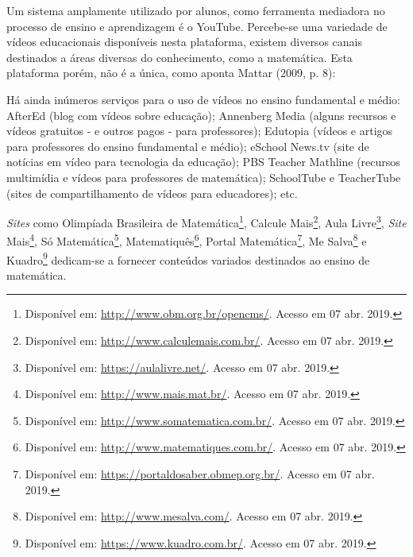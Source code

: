 \documentclass{IFNMG}
\begin{document}
Um sistema amplamente utilizado por alunos, como ferramenta mediadora no processo de ensino e aprendizagem é o YouTube. Percebe-se uma variedade de vídeos educacionais disponíveis nesta plataforma, existem diversos canais destinados a áreas diversas do conhecimento, como a matemática. Esta plataforma porém, não é a única, como aponta Mattar (2009, p. 8):
\begin{CitacaoLonga} 
Há ainda inúmeros serviços para o uso de vídeos no ensino fundamental e médio: AfterEd (blog com vídeos sobre educação); Annenberg Media (alguns recursos e vídeos gratuitos - e outros pagos - para professores); Edutopia (vídeos e artigos para professores do ensino fundamental e médio); eSchool News.tv (site de notícias em vídeo para tecnologia da educação); PBS Teacher Mathline (recursos multimídia e vídeos para professores de matemática); SchoolTube e TeacherTube (sites de compartilhamento de vídeos para educadores); etc. 
\end{CitacaoLonga} 

\textit{Sites} como Olimpíada Brasileira de Matemática\footnote[1]{Disponível em: \url{http://www.obm.org.br/opencms/}. Acesso em 07 abr. 2019.}, Calcule Mais\footnote[2]{Disponível em: \url{http://www.calculemais.com.br/}. Acesso em 07 abr. 2019.},  Aula Livre\footnote[3]{Disponível em: \url{https://aulalivre.net/}. Acesso em 07 abr. 2019.},  \textit{Site} Mais\footnote[4]{Disponível em: \url{http://www.mais.mat.br/}. Acesso em 07 abr. 2019.}, Só Matemática\footnote[5]{Disponível em: \url{http://www.somatematica.com.br/}. Acesso em 07 abr. 2019.}, Matematiquês\footnote[6]{Disponível em: \url{http://www.matematiques.com.br/}. Acesso em 07 abr. 2019.}, Portal Matemática\footnote[7]{Disponível em: \url{https://portaldosaber.obmep.org.br/}. Acesso em 07 abr. 2019.},  Me Salva\footnote[8]{Disponível em: \url{http://www.mesalva.com/}. Acesso em 07 abr. 2019.} e Kuadro\footnote[9]{Disponível em: \url{https://www.kuadro.com.br/}. Acesso em 07 abr. 2019.} dedicam-se a fornecer conteúdos variados destinados ao ensino de matemática.
\end{document}
